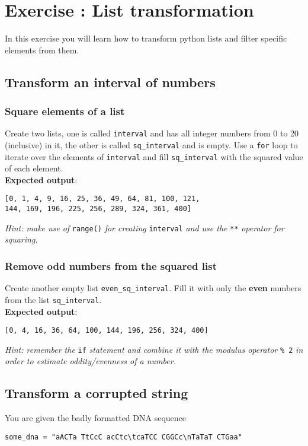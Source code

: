 \documentclass[12pt]{article}
\begin{document}
\section{Exercise : List transformation}
In this exercise you will learn how to transform python lists and filter specific elements from them.

\subsection{Transform an interval of numbers}

\subsubsection{Square elements of a list}
Create two lists, one is called \texttt{interval} and has all integer numbers from 0 to 20 (inclusive) in it, the other is called \verb|sq_interval| and is empty. Use a \texttt{for} loop to iterate over the elements of \texttt{interval} and fill \verb|sq_interval| with the squared value of each element.\\

\noindent\textbf{Expected output}:
\begin{verbatim}
[0, 1, 4, 9, 16, 25, 36, 49, 64, 81, 100, 121,
144, 169, 196, 225, 256, 289, 324, 361, 400]
\end{verbatim}

\noindent\emph{Hint: make use of} \texttt{range()} \emph{for creating} \texttt{interval} \emph{and use the } \texttt{**} \emph{operator for squaring.}

\subsubsection{Remove odd numbers from the squared list}
Create another empty list \verb|even_sq_interval|. Fill it with only the \textbf{even} numbers from the list \verb|sq_interval|.\\

\noindent\textbf{Expected output}:
\begin{verbatim}
[0, 4, 16, 36, 64, 100, 144, 196, 256, 324, 400]
\end{verbatim}

\noindent\emph{Hint: remember the} \texttt{if} \emph{statement and combine it with the modulus operator } \texttt{\% 2} \emph{in order to estimate oddity/evenness of a number.}


\subsection{Transform a corrupted string}
You are given the badly formatted DNA sequence 
\begin{verbatim}
some_dna = "aACTa TtCcC acCtc\tcaTCC CGGCc\nTaTaT CTGaa"
\end{verbatim}
\end{document}
